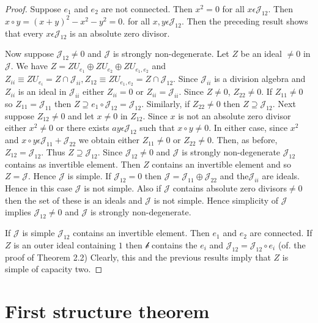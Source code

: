 \begin{proof}
Suppose $e_1$ and $e_2$ are not connected. Then $x^{2}=0$ for all
$x\epsilon \mathscr{J}_{12}$. Then $x\circ
y=(x+y)^{2}-x^{2}-y^{2}=0$. for all $x,y\epsilon
\mathscr{J}_{12}$. Then the preceding result shows that every
$x\epsilon \mathscr{J}_{12}$ is an absolute zero divisor.

Now suppose $\mathscr{J}_{12}\neq 0$ and $\mathscr{J}$ is strongly
non-degenerate. Let $Z$ be an ideal $\neq 0$ in
$\mathscr{J}$. We have $Z=ZU_{e_1}\oplus
Z U_{e_2}\oplus Z U_{e_1,e_2}$ and
$Z_{ii}\equiv Z U_{e_i}=Z \cap
\mathscr{J}_{ii},Z_{12}\equiv Z
U_{e_1,e_2}=Z\cap \mathscr{J}_{12}$. Since
$\mathscr{J}_{ii}$ is a division algebra and $Z_{ii}$ is an
ideal in $\mathscr{J}_{ii}$ either $Z_{ii}=0$ or
$Z_{ii}=\mathscr{J}_{ii}$. Since $Z \neq 0$,
$Z_{22}\neq 0$. If $Z_{11}\neq 0$ so
$Z_{11}=\mathscr{J}_{11}$ then $Z\supseteq
e_1\circ \mathscr{J}_{12}=\mathscr{J}_{12}$. Similarly, if
$Z_{22}\neq 0$ then $Z\supseteq
\mathscr{J}_{12}$. Next suppose $Z_{12}\neq 0$ and let
$x\neq 0$ in $Z_{12}$. Since $x$ is not an absolute zero
divisor either $x^{2}\neq 0$ or there exists $a y\epsilon
\mathscr{J}_{12}$ such that $x\circ y\neq 0$. In either case, since
$x^{2}$ and $x\circ y\epsilon \mathscr{J}_{11}+\mathscr{J}_{22}$ we
obtain either $Z_{11}\neq 0$ or $Z_{22}\neq
0$. Then, as before, $Z_{12}=\mathscr{J}_{12}$. Thus
$Z\supseteq \mathscr{J}_{12}$. Since $\mathscr{J}_{12}\neq
0$ and $\mathscr{J}$ is strongly non-degenerate $\mathscr{J}_{12}$
contains as invertible element. Then $Z$ contains an
invertible element and so $Z=\mathscr{J}$. Hence
$\mathscr{J}$ is simple. If $\mathscr{J}_{12}=0$ then
$\mathscr{J}=\mathscr{J}_{11}\oplus \mathscr{J}_{22}$ and
the\pageoriginale $\mathscr{J}_{ii}$ are ideals. Hence in this case
$\mathscr{J}$ is not simple. Also if $\mathscr{J}$ contains absolute
zero divisors$\neq 0$ then the set of these is an ideals and
$\mathscr{J}$ is not simple. Hence simplicity of $\mathscr{J}$ implies
$\mathscr{J}_{12}\neq 0$ and $\mathscr{J}$ is strongly non-degenerate.

If $\mathscr{J}$ is simple $\mathscr{J}_{12}$ contains an invertible
element. Then $e_1$ and $e_2$ are connected. If $Z$ is an
outer ideal containing $1$ then $\mathscr{b}$ contains the $e_i$ and
$\mathscr{J}_{12}=\mathscr{J}_{12}\circ e_i$ (of. the proof of Theorem
2.2) Clearly, this and the previous results imply that $Z$
is simple of capacity two.
\end{proof}

\section{First structure theorem}\label{c3:sec7}

